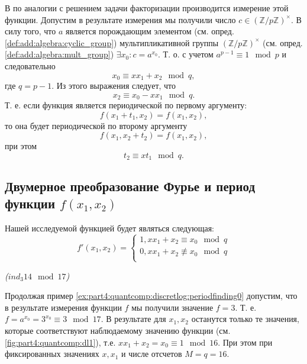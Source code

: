 В по аналогии с решением задачи факторизации производится измерение
этой функции. Допустим в результате измерения мы получили число $c \in
\left(\mathbb{Z}/p\mathbb{Z}\right)^\times$. В силу того, что $a$
является порождающим элементом (см. опред.
\ref{def:add:algebra:cyclic_group}) мультипликативной группы   
$\left(\mathbb{Z}/p\mathbb{Z}\right)^\times$ (см. опред.
\ref{def:add:algebra:mult_group}) $\exists x_0: c = a^{x_0}$. Т. о. с
учетом  $a^{p-1}
\equiv 1 \mod p$ и следовательно
\[
x_0 \equiv x x_1 + x_2 \mod q,
\] 
где $q = p - 1$.
Из этого выражения следует, что
\[
x_2 \equiv x_0 - x x_1 \mod q.
\]
Т. е. если функция является периодической по первому аргументу:
\[
f(x_1 + t_1, x_2) = f(x_1,x_2),
\]
то она будет периодической по второму аргументу
\[
f(x_1, x_2 + t_2) = f(x_1,x_2),
\]
при этом 
\begin{equation}
t_2 \equiv x t_1 \mod q.
\label{eq:part4:quantcomp:discretlogeq}
\end{equation}

\subsection{Двумерное преобразование Фурье и период функции $f(x_1,
  x_2)$}
Нашей исследуемой функцией будет являться следующая:
\begin{equation}
\label{eq:part4:quantcomp:shordiscretlog:fprime}
f'\left(x_1, x_2\right) = 
\begin{cases}
1, x x_1 + x_2 \equiv x_0 \mod q \\
0, x x_1 + x_2 \not\equiv x_0 \mod q \\
\end{cases}
\end{equation}
\begin{example}
\emph{($ind_3{14} \mod{17}$)}
%


Продолжая пример \ref{ex:part4:quantcomp:discretlog:periodfinding0}
допустим, что в результате измерения функции $f$ мы получили значение
$f = 3$. Т. е. $f = a^{x_0} = 3^{x_0} \equiv 3 \mod 17$.  
В результате для $x_1, x_2$ останутся только те значения, 
которые соответствуют наблюдаемому значению функции (см.
\autoref{fig:part4:quantcomp:dl1}), т.е. $x x_1 + x_2 = x_0 \equiv 1
\mod 16$. При этом при фиксированных значениях $x, x_1$ и числе
отсчетов $M = q = 16$. 
\label{ex:part4:quantcomp:discretlog:periodfinding1}
\end{example}


